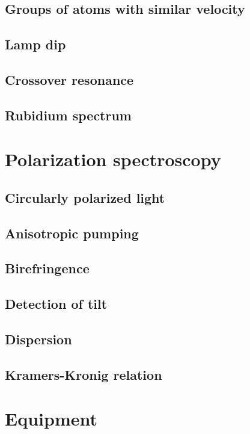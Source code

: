 \documentclass[11pt, english, fleqn, DIV=15, headinclude, BCOR=2cm]{scrreprt}
\begin{document}
\subsection{Groups of atoms with similar velocity}

\subsection{Lamp dip}

\subsection{Crossover resonance}

\subsection{Rubidium spectrum}

\section{Polarization spectroscopy}

\subsection{Circularly polarized light}

\subsection{Anisotropic pumping}

\subsection{Birefringence}

\subsection{Detection of tilt}

\subsection{Dispersion}

\subsection{Kramers-Kronig relation}

\section{Equipment}
\end{document}
